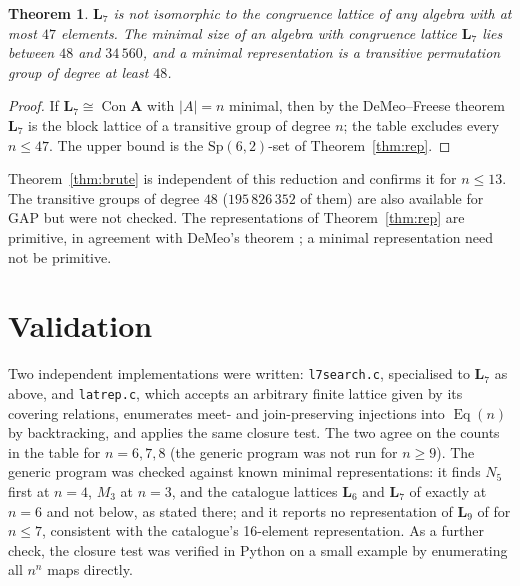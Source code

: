 \documentclass[11pt]{article}
\newtheorem{theorem}{Theorem}
\theoremstyle{remark}
\newcommand{\Con}{\operatorname{Con}}
\newcommand{\Eq}{\operatorname{Eq}}
\newcommand{\LL}{\mathbf{L}_7}
\begin{document}
\begin{theorem}\label{thm:trans}
$\LL$ is not isomorphic to the congruence lattice of any algebra with at most $47$ elements.
The minimal size of an algebra with congruence lattice $\LL$ lies between $48$ and $34\,560$,
and a minimal representation is a transitive permutation group of degree at least $48$.
\end{theorem}
\begin{proof}
If $\LL\cong\Con\mathbf A$ with $|A|=n$ minimal, then by the DeMeo--Freese theorem $\LL$ is the
block lattice of a transitive group of degree $n$; the table excludes every $n\le 47$. The upper
bound is the $\mathrm{Sp}(6,2)$-set of Theorem~\ref{thm:rep}.
\end{proof}

Theorem~\ref{thm:brute} is independent of this reduction and confirms it for $n\le 13$.
The transitive groups of degree $48$ ($195\,826\,352$ of them) are also available for GAP but
were not checked. The representations of Theorem~\ref{thm:rep} are primitive, in agreement with
DeMeo's theorem \cite[Thm.~4.1]{DeMeoIEP}; a minimal representation need not be primitive.

\section{Validation}

Two independent implementations were written: \texttt{l7search.c}, specialised to $\LL$ as
above, and \texttt{latrep.c}, which accepts an arbitrary finite lattice given by its covering
relations, enumerates meet- and join-preserving injections into $\Eq(n)$ by backtracking, and applies
the same closure test. The two agree on the counts in the table for $n=6,7,8$ (the generic
program was not run for $n\ge 9$). The generic program was checked against known minimal
representations: it finds $N_5$ first at $n=4$, $M_3$ at $n=3$, and the catalogue lattices
$\mathbf L_6$ and $\mathbf L_7$ of \cite{DeMeoFreese} exactly at $n=6$ and not below, as stated
there; and it reports no representation of $\mathbf L_9$ of \cite{DeMeoFreese} for $n\le 7$,
consistent with the catalogue's 16-element representation. As a further check, the closure
test was verified in Python on a small example by enumerating all $n^n$ maps directly.
\end{document}

